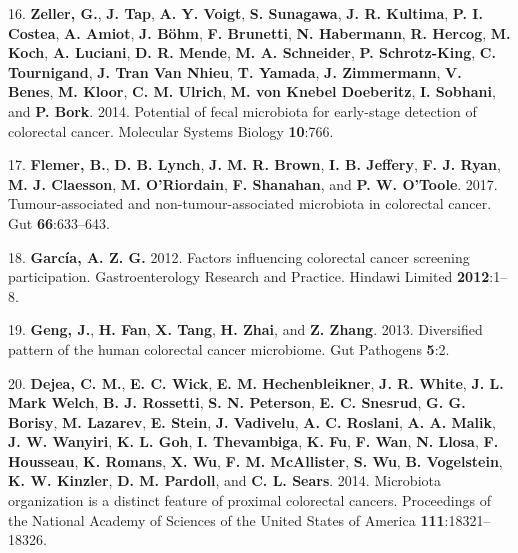 \documentclass[12pt,]{article}
\begin{document}
\hypertarget{ref-zeller_potential_2014}{}
16. \textbf{Zeller, G.}, \textbf{J. Tap}, \textbf{A. Y. Voigt},
\textbf{S. Sunagawa}, \textbf{J. R. Kultima}, \textbf{P. I. Costea},
\textbf{A. Amiot}, \textbf{J. Böhm}, \textbf{F. Brunetti}, \textbf{N.
Habermann}, \textbf{R. Hercog}, \textbf{M. Koch}, \textbf{A. Luciani},
\textbf{D. R. Mende}, \textbf{M. A. Schneider}, \textbf{P.
Schrotz-King}, \textbf{C. Tournigand}, \textbf{J. Tran Van Nhieu},
\textbf{T. Yamada}, \textbf{J. Zimmermann}, \textbf{V. Benes},
\textbf{M. Kloor}, \textbf{C. M. Ulrich}, \textbf{M. von Knebel
Doeberitz}, \textbf{I. Sobhani}, and \textbf{P. Bork}. 2014. Potential
of fecal microbiota for early-stage detection of colorectal cancer.
Molecular Systems Biology \textbf{10}:766.

\hypertarget{ref-flemer_tumour-associated_2017}{}
17. \textbf{Flemer, B.}, \textbf{D. B. Lynch}, \textbf{J. M. R. Brown},
\textbf{I. B. Jeffery}, \textbf{F. J. Ryan}, \textbf{M. J. Claesson},
\textbf{M. O'Riordain}, \textbf{F. Shanahan}, and \textbf{P. W.
O'Toole}. 2017. Tumour-associated and non-tumour-associated microbiota
in colorectal cancer. Gut \textbf{66}:633--643.

\hypertarget{ref-GimenoGarca2012}{}
18. \textbf{García, A. Z. G.} 2012. Factors influencing colorectal
cancer screening participation. Gastroenterology Research and Practice.
Hindawi Limited \textbf{2012}:1--8.

\hypertarget{ref-geng_diversified_2013}{}
19. \textbf{Geng, J.}, \textbf{H. Fan}, \textbf{X. Tang}, \textbf{H.
Zhai}, and \textbf{Z. Zhang}. 2013. Diversified pattern of the human
colorectal cancer microbiome. Gut Pathogens \textbf{5}:2.

\hypertarget{ref-dejea_microbiota_2014}{}
20. \textbf{Dejea, C. M.}, \textbf{E. C. Wick}, \textbf{E. M.
Hechenbleikner}, \textbf{J. R. White}, \textbf{J. L. Mark Welch},
\textbf{B. J. Rossetti}, \textbf{S. N. Peterson}, \textbf{E. C.
Snesrud}, \textbf{G. G. Borisy}, \textbf{M. Lazarev}, \textbf{E. Stein},
\textbf{J. Vadivelu}, \textbf{A. C. Roslani}, \textbf{A. A. Malik},
\textbf{J. W. Wanyiri}, \textbf{K. L. Goh}, \textbf{I. Thevambiga},
\textbf{K. Fu}, \textbf{F. Wan}, \textbf{N. Llosa}, \textbf{F.
Housseau}, \textbf{K. Romans}, \textbf{X. Wu}, \textbf{F. M.
McAllister}, \textbf{S. Wu}, \textbf{B. Vogelstein}, \textbf{K. W.
Kinzler}, \textbf{D. M. Pardoll}, and \textbf{C. L. Sears}. 2014.
Microbiota organization is a distinct feature of proximal colorectal
cancers. Proceedings of the National Academy of Sciences of the United
States of America \textbf{111}:18321--18326.
\end{document}
